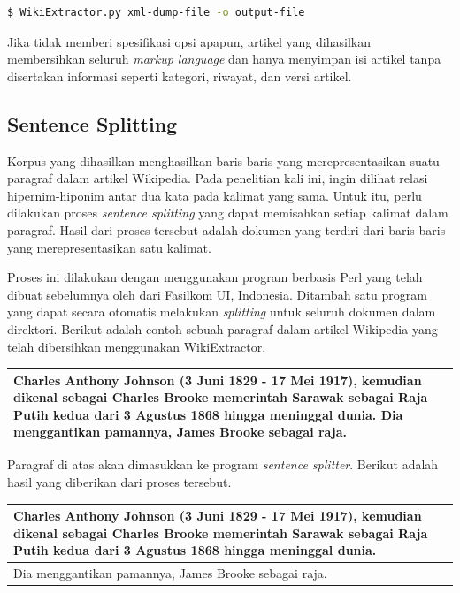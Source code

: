 \begin{lstlisting}[caption={Penggunaan Wiki Extractor}, language=bash]
$ WikiExtractor.py xml-dump-file -o output-file
\end{lstlisting}

\noindent Jika tidak memberi spesifikasi opsi apapun, artikel yang dihasilkan membersihkan seluruh \textit{markup language} dan hanya menyimpan isi artikel tanpa disertakan informasi seperti kategori, riwayat, dan versi artikel.

\subsection{Sentence Splitting}
Korpus yang dihasilkan menghasilkan baris-baris yang merepresentasikan suatu paragraf dalam artikel Wikipedia. Pada penelitian kali ini, ingin dilihat relasi hipernim-hiponim antar dua kata pada kalimat yang sama. Untuk itu, perlu dilakukan proses \textit{sentence splitting} yang dapat memisahkan setiap kalimat dalam paragraf. Hasil dari proses tersebut adalah dokumen yang terdiri dari baris-baris yang merepresentasikan satu kalimat. 

Proses ini dilakukan dengan menggunakan program berbasis Perl yang telah dibuat sebelumnya oleh \cite{ken2016pengembangan} dari Fasilkom UI, Indonesia. Ditambah satu program yang dapat secara otomatis melakukan \textit{splitting} untuk seluruh dokumen dalam direktori. Berikut adalah contoh sebuah paragraf dalam artikel Wikipedia yang telah dibersihkan menggunakan WikiExtractor.

\begin{center}
\begin{tabular}{ | m{32em} | } 
\hline
Charles Anthony Johnson (3 Juni 1829 - 17 Mei 1917), kemudian dikenal sebagai Charles Brooke memerintah Sarawak sebagai Raja Putih kedua dari 3 Agustus 1868 hingga meninggal dunia. Dia menggantikan pamannya, James Brooke sebagai raja. \\ \hline 
\end{tabular}
\end{center}

\noindent Paragraf   di atas akan dimasukkan ke program \textit{sentence splitter}. Berikut adalah hasil yang diberikan dari proses tersebut.

\begin{center}
\begin{tabular}{ | m{32em} | } 
\hline
Charles Anthony Johnson (3 Juni 1829 - 17 Mei 1917), kemudian dikenal sebagai Charles Brooke memerintah Sarawak sebagai Raja Putih kedua dari 3 Agustus 1868 hingga meninggal dunia. \\ \hline 
Dia menggantikan pamannya, James Brooke sebagai raja. \\
\hline
\end{tabular}
\end{center}

